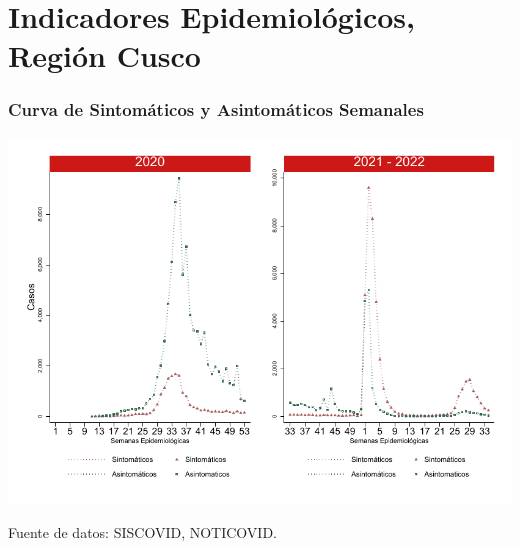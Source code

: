 \documentclass[xcolor=table]{beamer}
\begin{document}


\section{Indicadores Epidemiológicos, Región Cusco}
	\begin{frame}
		\frametitle{Curva de Sintomáticos y Asintomáticos Semanales}
		\vspace{-.5cm}
		\begin{center}
			\includegraphics[width=0.9\linewidth]{../figuras/sintomaticos_20_21_22.pdf}
		\end{center} 
		{\tiny Fuente de datos: SISCOVID, NOTICOVID.}
	\end{frame}
	
\end{document}
